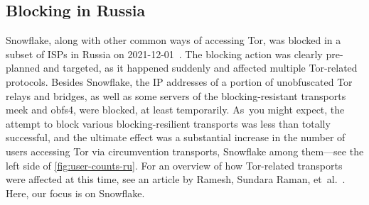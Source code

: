 \documentclass[letterpaper,twocolumn]{article}
\begin{document}
\subsection{Blocking in Russia}
\label{sec:block-ru}


Snowflake, along with other common ways of accessing Tor,
was blocked in a subset of ISPs in Russia
on \mbox{2021-12-01}~\cite{ooni-2021-russia-blocks-tor}.
The blocking action was clearly pre-planned and targeted,
as it happened suddenly and affected multiple Tor-related protocols.
Besides Snowflake,
the IP addresses of a portion
of unobfuscated Tor relays and bridges,
as well as some servers of
the blocking-resistant transports meek and obfs4,
were blocked, at least temporarily.
As~you might expect, the attempt to block
various blocking-resilient transports
was less than totally successful,
and the ultimate effect was a substantial increase in the number
of users accessing Tor via circumvention transports,
Snowflake among them---see the left side of \autoref{fig:user-counts-ru}.
For an overview of how Tor-related transports were affected at this time,
see an article by Ramesh, Sundara Raman, et~al.~\cite[\S 6.2]{Ramesh2023a}.
Here, our focus is on Snowflake.
\end{document}

